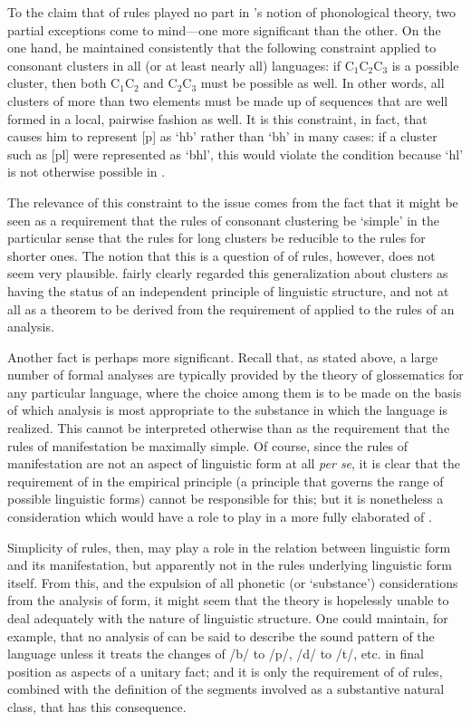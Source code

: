 To the claim that  of {rules} played no part in {\Hjelmslev}'s
notion of phonological theory, two partial exceptions come to mind—one
more significant than the other. On the one hand, he maintained
consistently that the following constraint applied to consonant
clusters in all (or at least nearly all) languages: if
C$_{1}$C$_{2}$C$_{3}$ is a possible cluster, then both C$_{1}$C$_{2}$
and C$_{2}$C$_{3}$ must be possible as well. In other words, all
clusters of more than two elements must be made up of sequences that
are well formed in a local, pairwise fashion as well. It is this
constraint, in fact, that causes him to represent  {[p]} as `hb'
rather than `bh' in many cases: if a cluster such as {[pl]} were
represented as `bhl', this would violate the condition because `hl' is
not otherwise possible in .

The relevance of this constraint to the  issue comes from
the fact that it might be seen as a requirement that the {rules} of
consonant clustering be `simple' in the particular sense that the
{rules} for long clusters be reducible to the {rules} for shorter
ones. The notion that this is a question of  of {rules},
however, does not seem very plausible. {\Hjelmslev} fairly clearly
regarded this generalization about clusters as having the status of an
independent principle of linguistic structure, and not at all as a
theorem to be derived from the requirement of  applied to
the {rules} of an analysis.

Another fact is perhaps more significant. Recall that, as stated
above, a large number of formal analyses are typically provided by the
theory of glossematics for any particular language, where the choice
among them is to be made on the basis of which analysis is most
appropriate to the substance in which the language is realized. This
cannot be interpreted otherwise than as the requirement that the {rules}
of manifestation be maximally simple. Of course, since the {rules} of
manifestation are not an aspect of linguistic form at all \emph{per
  se}, it is clear that the requirement of  in the empirical
principle (a principle that governs the range of possible linguistic
forms) cannot be responsible for this; but it is nonetheless a
consideration which would have a role to play in a more fully
elaborated  of .

Simplicity of {rules}, then, may play a role in the relation between
linguistic form and its manifestation, but apparently not in the {rules}
underlying linguistic form itself. From this, and the expulsion of all
phonetic (or `substance') considerations from the analysis of form, it
might seem that the theory is hopelessly unable to deal adequately
with the nature of linguistic structure. One could maintain, for
example, that no analysis of  can be said to describe the sound
pattern of the language unless it treats the changes of /b/ to /p/,
/d/ to /t/, etc. in  final position as aspects of a unitary
fact; and it is only the requirement of  of {rules}, combined
with the definition of the segments involved as a substantive natural
class, that has this consequence.

